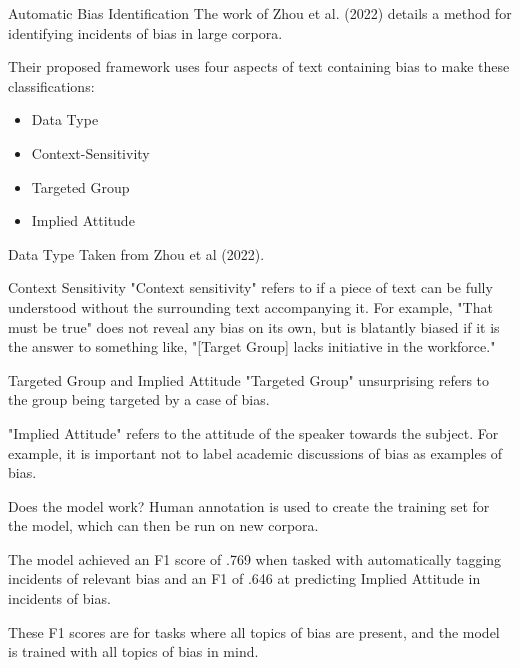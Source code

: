 \documentclass[10pt]{beamer}
\begin{document}
\begin{frame}{Automatic Bias Identification}
The work of Zhou et al. (2022) details a method for identifying incidents of bias in large corpora.

Their proposed framework uses four aspects of text containing bias to make these classifications:
\begin{itemize}
    \item Data Type
    \item Context-Sensitivity
    \item Targeted Group
    \item Implied Attitude
\end{itemize}
\end{frame}

\begin{frame}{Data Type}
Taken from Zhou et al (2022).
\end{frame}

\begin{frame}{Context Sensitivity}
"Context sensitivity" refers to if a piece of text can be fully understood without the surrounding text accompanying it. For example, "That must be true" does not reveal any bias on its own, but is blatantly biased if it is the answer to something like, "[Target Group] lacks initiative in the workforce."
\end{frame}

\begin{frame}{Targeted Group and Implied Attitude}
"Targeted Group" unsurprising refers to the group being targeted by a case of bias.

"Implied Attitude" refers to the attitude of the speaker towards the subject. For example, it is important not to label academic discussions of bias as examples of bias.
\end{frame}

\begin{frame}{Does the model work?}
Human annotation is used to create the training set for the model, which can then be run on new corpora.

The model achieved an F1 score of .769 when tasked with automatically tagging incidents of relevant bias and an F1 of .646 at predicting Implied Attitude in incidents of bias.

These F1 scores are for tasks where all topics of bias are present, and the model is trained with all topics of bias in mind.
\end{frame}
\end{document}
